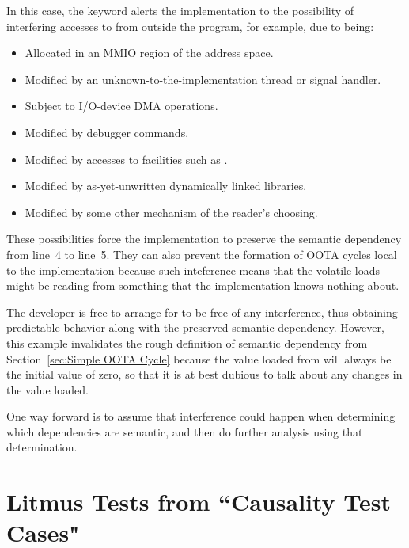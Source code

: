 \documentclass[10]{article}
\begin{document}
In this case, the  keyword alerts the implementation to
the possibility of interfering accesses to  from outside the
program, for example, due to  being:

\begin{itemize}
\item	Allocated in an MMIO region of the address space.
\item	Modified by an unknown-to-the-implementation thread
	or signal handler.
\item	Subject to I/O-device DMA operations.
\item	Modified by debugger commands.
\item	Modified by accesses to facilities such as .
\item	Modified by as-yet-unwritten dynamically linked libraries.
\item	Modified by some other mechanism of the reader's choosing.
\end{itemize}

These possibilities force the implementation to preserve the semantic
dependency from line~4 to line~5.
They can also prevent the formation of OOTA cycles local to the
implementation because such inteference means that the volatile loads
might be reading from something that the implementation knows nothing
about.

The developer is free to arrange for  to be free of any
interference, thus obtaining predictable behavior along with the
preserved semantic dependency.
However, this example invalidates the rough definition of semantic
dependency from
Section~\ref{sec:Simple OOTA Cycle}
because the value loaded from  will always be the initial value
of zero, so that it is at best dubious to talk about any changes in
the value loaded.

One way forward is to assume that interference could happen when
determining which dependencies are semantic, and then do further analysis
using that determination.


\clearpage

\section{Litmus Tests from “Causality Test Cases"}
\label{app:Litmus Tests from “Causality Test Cases"}
\end{document}
